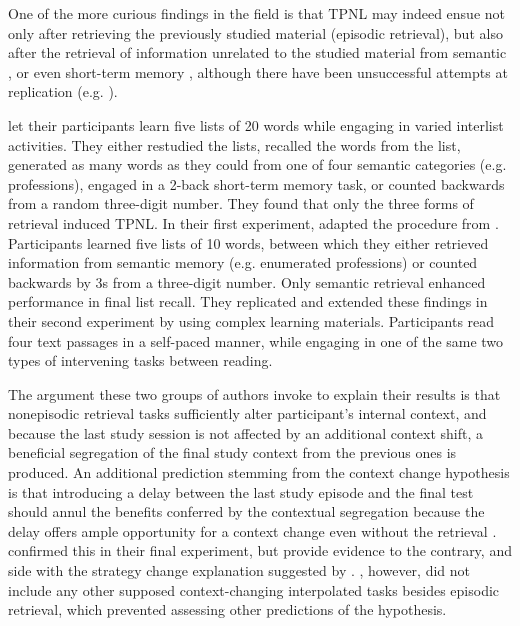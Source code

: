 \documentclass[../main.tex]{subfiles}
\begin{document}
One of the more curious findings in the field is that TPNL may indeed 
ensue not only after retrieving the previously studied material (episodic 
retrieval), but also after the retrieval of information unrelated to the 
studied material from semantic \citep{divisRetrievalSpeedsContext2014, 
	pastotterRetrievalLearningFacilitates2011}, or even short-term memory 
	\citep{pastotterRetrievalLearningFacilitates2011}, although there have 
	been unsuccessful attempts at replication (e.g. 
\citealp{weinsteinNotAllRetrieval2015}). 

\cite{pastotterRetrievalLearningFacilitates2011} let their participants 
learn five lists of 20 words while engaging in varied interlist activities. 
They either restudied the lists, recalled the words from the list, generated 
as many words as they could from one of four semantic categories (e.g. 
professions), engaged in a 2-back short-term memory task, or counted 
backwards from a random three-digit number. They found that only the three 
forms of retrieval induced TPNL. In their first experiment, 
\cite{divisRetrievalSpeedsContext2014} adapted the procedure from 
\cite{pastotterRetrievalLearningFacilitates2011}. Participants learned five 
lists of 10 words, between which they either retrieved information from 
semantic memory (e.g. enumerated professions) or counted backwards by 3s 
from a three-digit number. Only semantic retrieval enhanced performance in 
final list recall. They replicated and extended these findings in their 
second experiment by using complex learning materials. Participants read 
four text passages in a self-paced manner, while engaging in one of the same 
two types of intervening tasks between reading. 

The argument these two groups of authors invoke to explain their results is 
that nonepisodic retrieval tasks sufficiently alter participant's internal 
context, and because the last study session is not affected by an additional 
context shift, a beneficial segregation of the final study context from the 
previous ones is produced. An additional prediction stemming from the 
context change hypothesis is that introducing a delay between the last study 
episode and the final test should annul the benefits conferred by the 
contextual segregation because the delay offers ample opportunity for a 
context change even without the retrieval 
\citep{chanRetrievalPotentiatesNew2018}. 
\cite{divisRetrievalSpeedsContext2014} confirmed this in their final 
experiment, but \cite{chanTestingPotentiatesNew2018} provide evidence to the 
contrary, and side with the strategy change explanation suggested by 
\cite{wissmanInterimTestEffect2011}. \cite{chanTestingPotentiatesNew2018}, 
however, did not include any other supposed context-changing interpolated 
tasks besides episodic retrieval, which prevented assessing other 
predictions of the hypothesis. 
\end{document}
